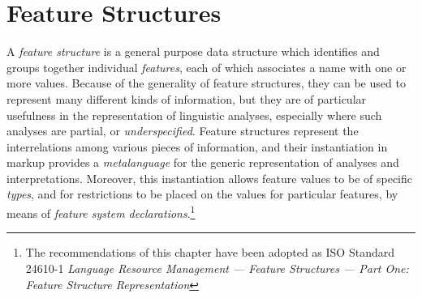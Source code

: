 
\section[{Feature Structures}]{Feature Structures}\label{FS}\par
A \textit{feature structure} is a general purpose data structure which identifies and groups together individual \textit{features}, each of which associates a name with one or more values. Because of the generality of feature structures, they can be used to represent many different kinds of information, but they are of particular usefulness in the representation of linguistic analyses, especially where such analyses are partial, or \textit{underspecified}. Feature structures represent the interrelations among various pieces of information, and their instantiation in markup provides a \textit{metalanguage} for the generic representation of analyses and interpretations. Moreover, this instantiation allows feature values to be of specific \textit{types}, and for restrictions to be placed on the values for particular features, by means of \textit{feature system declarations}.\footnote{The recommendations of this chapter have been adopted as ISO Standard 24610-1 \textit{Language Resource Management — Feature Structures — Part One: Feature Structure Representation}}

